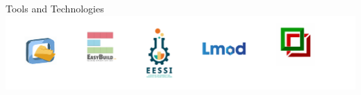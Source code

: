 \documentclass[final]{beamer}
\begin{document}
\begin{frame}[t]
\begin{columns}[t]
\begin{column}{0.48\textwidth}
  \end{column}
\end{columns}

\vfill
\begin{block}{\centering \normalsize Tools and Technologies}
  \centering
  \includegraphics[width=0.66\paperwidth]{./include/logos.pdf}
\end{block}

\end{frame}
\end{document}
